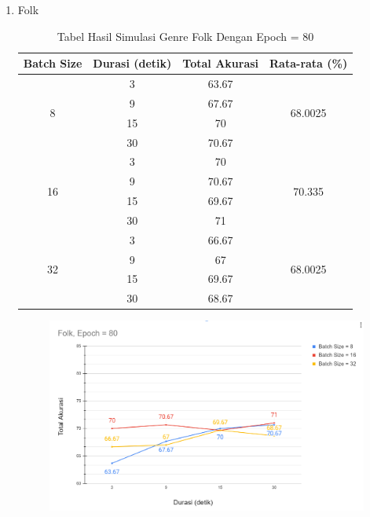 \begin{enumerate}
	\item Folk
		\begin{longtable}[c]{|c|c|c|c|}
			\caption{Tabel Hasil Simulasi Genre Folk Dengan Epoch = 80}
			\label{tab:my-table}\\
			\hline
			\textbf{Batch Size} & \textbf{Durasi (detik)} & \textbf{Total Akurasi} & \textbf{Rata-rata (\%)}       \\ \hline
			\endfirsthead
			\endhead
			\multirow{4}{*}{8}  & 3                       & 63.67                  & \multirow{4}{*}{68.0025} \\ \cline{2-3}
			& 9                       & 67.67                  &                          \\ \cline{2-3}
			& 15                      & 70                     &                          \\ \cline{2-3}
			& 30                      & 70.67                  &                          \\ \hline
			\multirow{4}{*}{16} & 3                       & 70                     & \multirow{4}{*}{70.335}  \\ \cline{2-3}
			& 9                       & 70.67                  &                          \\ \cline{2-3}
			& 15                      & 69.67                  &                          \\ \cline{2-3}
			& 30                      & 71                     &                          \\ \hline
			\multirow{4}{*}{32} & 3                       & 66.67                  & \multirow{4}{*}{68.0025} \\ \cline{2-3}
			& 9                       & 67                     &                          \\ \cline{2-3}
			& 15                      & 69.67                  &                          \\ \cline{2-3}
			& 30                      & 68.67                  &                          \\ \hline
		\end{longtable}
		
		\begin{figure}[H]
			\centering
			
			\includegraphics[width=\textwidth]{gambar/e80_chart_sum accuracy_folk}
			

\end{figure}
\end{enumerate}
